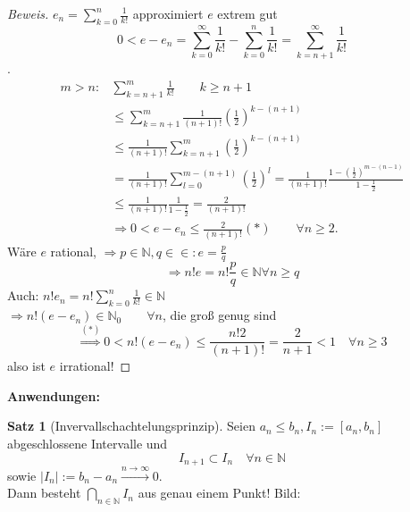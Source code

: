 \documentclass[12pt,a4paper,titlepage]{article} %
\theoremstyle{definition}
\newtheorem{satz}{Satz}[subsection]
\theoremstyle{remark}
\newenvironment{bew}{\begin{proof}[Beweis]}{\end{proof}}
\newcommand{\N}{\mathbb{N}}
\begin{document}
\begin{bew}
	\(e_n = \sum_{k=0}^{n} \frac{1}{k!} \) approximiert \(e\) extrem gut\\
	\[ 0< e-e_n = \sum_{k=0}^{\infty} \frac{1}{k!} - \sum_{k=0}^{n} \frac{1}{k!} = \sum_{k=n+1}^{\infty} \frac{1}{k!} \].
	\begin{align*}
		m>n: &\sum_{k=n+1}^{m} \frac{1}{k!} \qquad k \geq n+1\\
		&\leq \sum_{k=n+1}^{m} \frac{1}{(n+1)!} \left(\frac{1}{2}\right)^{k-(n+1)}\\
		&\leq \frac{1}{(n+1)!} \sum_{k=n+1}^{m} \left(\frac{1}{2}\right)^{k-(n+1)}\\
		&= \frac{1}{(n+1)!} \sum_{l=0}^{m-(n+1)} (\frac{1}{2})^l = \frac{1}{(n+1)!} \frac{1-(\frac{1}{2})^{m-(n-1)}}{1-\frac{1}{2}}\\
		&\leq \frac{1}{(n+1)!} \frac{1}{1-\frac{1}{2}} = \frac{2}{(n+1)!}\\
		&\Rightarrow 0 < e - e_n \leq \frac{2}{(n+1)!} (*) \qquad\forall n\geq 2.
	\end{align*}
	Wäre \(e\) rational, \(\Rightarrow p\in\N,q\in\in:e=\frac{p}{q} \)
	\[ \Rightarrow n! e = n! \frac{p}{q} \in\N \forall n\geq q \]
	Auch: \( n! e_n = n! \sum_{k=0}^{n} \frac{1}{k!} \in\N \)\\
	\( \Rightarrow n!(e-e_n) \in\N_0 \qquad \forall n \), die groß genug sind
	\[ \overset{(*)}{\Rightarrow} 0<n!(e-e_n) \leq \frac{n!2}{(n+1)!} = \frac{2}{n+1} < 1 \quad \forall n\geq 3 \]
	\Lightning also ist \(e\) irrational!
\end{bew}
\textbf{Anwendungen:}
\begin{satz}[Invervallschachtelungsprinzip]
	Seien \( a_n\leq b_n, I_n := [a_n,b_n] \) abgeschlossene Intervalle und \[I_{n+1} \subset I_n \quad \forall n\in\N\]
	sowie \( |I_n| := b_n - a_n \overset{n\rightarrow\infty}{\rightarrow} 0 \).\\
	Dann besteht \(\bigcap_{n\in\N} I_n\) aus genau einem Punkt!
	Bild: %
\end{satz}
\end{document}
